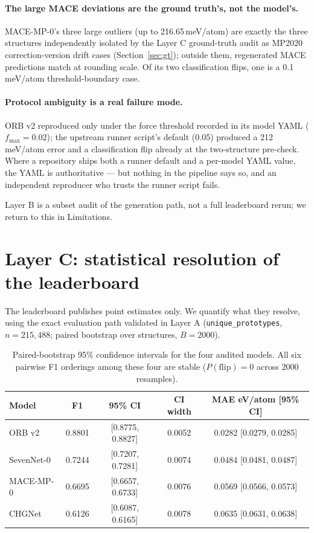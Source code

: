 \documentclass[11pt]{article}
\newcommand{\code}[1]{\texttt{#1}}
\newcommand{\meV}{\,meV/atom}
\begin{document}
\paragraph{The large MACE deviations are the ground truth's, not the
model's.} MACE-MP-0's three large outliers (up to 216.65\meV) are exactly the
three structures independently isolated by the Layer C ground-truth audit as
MP2020 correction-version drift cases (Section~\ref{sec:gt}); outside them,
regenerated MACE predictions match at rounding scale. Of its two
classification flips, one is a 0.1\meV{} threshold-boundary case.

\paragraph{Protocol ambiguity is a real failure mode.} ORB v2 reproduced
only under the force threshold recorded in its model YAML
($f_\mathrm{max}=0.02$); the upstream runner script's default (0.05) produced
a 212\meV{} error and a classification flip already at the two-structure
pre-check. Where a repository ships both a runner default and a per-model
YAML value, the YAML is authoritative --- but nothing in the pipeline says so,
and an independent reproducer who trusts the runner script fails.

Layer B is a subset audit of the generation path, not a full leaderboard
rerun; we return to this in Limitations.

\section{Layer C: statistical resolution of the leaderboard}
\label{sec:stats}

The leaderboard publishes point estimates only. We quantify what they resolve,
using the exact evaluation path validated in Layer A
(\code{unique\_prototypes}, $n=215{,}488$; paired bootstrap over structures,
$B=2000$).

\begin{table}[t]
\centering
\small
\caption{Paired-bootstrap 95\% confidence intervals for the four audited
models. All six pairwise F1 orderings among these four are stable
($P(\mathrm{flip})=0$ across 2000 resamples).}
\label{tab:ci}
\begin{tabular}{lcccc}
\toprule
Model & F1 & 95\% CI & CI width & MAE eV/atom [95\% CI] \\
\midrule
ORB v2     & 0.8801 & [0.8775, 0.8827] & 0.0052 & 0.0282 [0.0279, 0.0285] \\
SevenNet-0 & 0.7244 & [0.7207, 0.7281] & 0.0074 & 0.0484 [0.0481, 0.0487] \\
MACE-MP-0  & 0.6695 & [0.6657, 0.6733] & 0.0076 & 0.0569 [0.0566, 0.0573] \\
CHGNet     & 0.6126 & [0.6087, 0.6165] & 0.0078 & 0.0635 [0.0631, 0.0638] \\
\bottomrule
\end{tabular}
\end{table}
\end{document}
